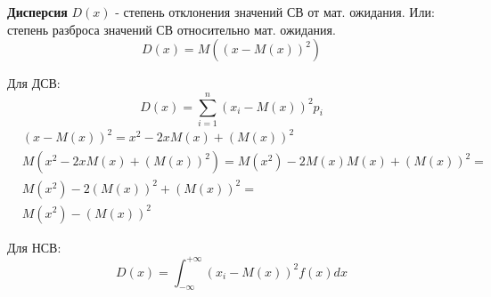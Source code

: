     \begin{opr}
        \textbf{Дисперсия} \(D(x)\) - степень отклонения значений СВ от мат. ожидания. 
        Или: степень разброса значений СВ относительно мат. ожидания.
        \begin{equation}
            D(x) = M((x - M(x))^{2})
        \end{equation}

        Для ДСВ:
        \begin{equation}
            D(x) = \sum_{i = 1}^{n}(x_{i} - M(x))^{2}p_{i}
        \end{equation}
        \begin{equation}
            \begin{align*}
                &(x - M(x))^{2} = x^{2} - 2xM(x) + (M(x))^{2}\\
                &M(x^{2} - 2xM(x) + (M(x))^{2}) = M(x^{2}) - 2M(x)M(x) + (M(x))^{2} = \\
                &M(x^{2}) - 2(M(x))^{2} + (M(x))^{2} = \\
                &M(x^{2}) - (M(x))^{2}
            \end{align*}
        \end{equation}

        Для НСВ:
        \begin{equation}
            D(x) = \int_{-\infty}^{+\infty}(x_{i} - M(x))^{2}f(x)dx
        \end{equation}
    \end{opr}

